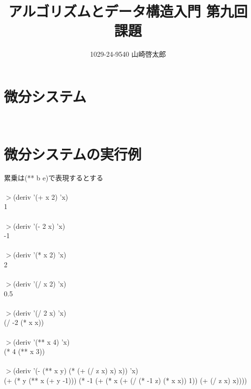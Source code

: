 ﻿\documentclass[a4paper,12pt]{article}
\title{アルゴリズムとデータ構造入門 第九回課題}
\author{1029-24-9540 山崎啓太郎}
\begin{document}
\maketitle

\section{微分システム}
\lstset{numbers=left,basicstyle=\small}

\\
\section{微分システムの実行例}
累乗は(** b e)で表現するとする\\
\\
$>$(deriv '(+ x 2) 'x)\\
1\\
\\
$>$(deriv '(- 2 x) 'x)\\
-1\\
\\
$>$(deriv '(* x 2) 'x)\\
2\\
\\
$>$(deriv '(/ x 2) 'x)\\
0.5\\
\\
$>$(deriv '(/ 2 x) 'x)\\
(/ -2 (* x x))\\
\\
$>$(deriv '(** x 4) 'x)\\
(* 4 (** x 3))\\
\\
$>$(deriv '(- (** x y) (* (+ (/ z x) x) x)) 'x)\\
(+ (* y (** x (+ y -1))) (* -1 (+ (* x (+ (/ (* -1 z) (* x x)) 1)) (+ (/ z x) x))))\\
\end{document}
